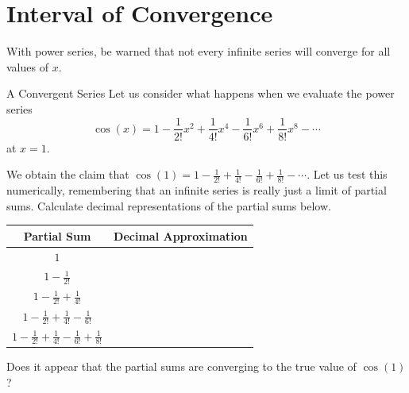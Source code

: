 
\section{Interval of Convergence}

With power series, be warned that not every infinite series will converge for all values of $x$. 

\begin{exercise}{A Convergent Series \Coffeecup}
Let us consider what happens when we evaluate the power series $$\cos(x)=1-\frac{1}{2!}x^2+\frac{1}{4!}x^4-\frac{1}{6!}x^6+\frac{1}{8!}x^8-\cdots  $$ at $x=1$.

We obtain the claim that $\cos(1)=1-\frac{1}{2!}+\frac{1}{4!}-\frac{1}{6!}+\frac{1}{8!}-\cdots$.  Let us test this numerically, remembering that an infinite series is really just a limit of partial sums.  Calculate decimal representations of the partial sums below.
\begin{center}
\begin{tabular}{|c|c|}\hline
Partial Sum & Decimal Approximation \\ \hline
$1$ & \\
$1-\frac{1}{2!}$ & \\
$1-\frac{1}{2!}+\frac{1}{4!}$ & \\
$1-\frac{1}{2!}+\frac{1}{4!}-\frac{1}{6!}$ & \\
$1-\frac{1}{2!}+\frac{1}{4!}-\frac{1}{6!}+\frac{1}{8!}$ & \\ \hline
\end{tabular}
\end{center}
Does it appear that the partial sums are converging to the true value of $\cos(1)$? \vspace*{1in}

\end{exercise}

